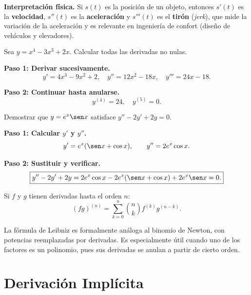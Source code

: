 \textbf{Interpretación física.} Si $s(t)$ es la posición de un objeto, entonces $s'(t)$ es la \textbf{velocidad}, $s''(t)$ es la \textbf{aceleración} y $s'''(t)$ es el \textbf{tirón} (\emph{jerk}), que mide la variación de la aceleración y es relevante en ingeniería de confort (diseño de vehículos y elevadores).

\begin{example}
Sea $y = x^4 - 3x^3 + 2x$. Calcular todas las derivadas no nulas.

\begin{myproof}

\textbf{Paso 1: Derivar sucesivamente.}
\[
y' = 4x^3-9x^2+2, \quad y'' = 12x^2-18x, \quad y''' = 24x-18.
\]

\textbf{Paso 2: Continuar hasta anularse.}
\[
\boxed{y^{(4)} = 24, \quad y^{(5)} = 0.}
\]
\end{myproof}
\end{example}

\begin{example}
Demostrar que $y = e^x\sen x$ satisface $y''-2y'+2y=0$.

\begin{myproof}

\textbf{Paso 1: Calcular $y'$ y $y''$.}
\[
y' = e^x(\sen x+\cos x), \qquad y'' = 2e^x\cos x.
\]

\textbf{Paso 2: Sustituir y verificar.}
\[
\boxed{y''-2y'+2y = 2e^x\cos x - 2e^x(\sen x+\cos x) + 2e^x\sen x = 0.}
\]
\end{myproof}
\end{example}

\begin{theorem}
Si $f$ y $g$ tienen derivadas hasta el orden $n$:
\[
(fg)^{(n)} = \sum_{k=0}^{n}\binom{n}{k}f^{(k)}g^{(n-k)}.
\]
\end{theorem}

\begin{rem}
La fórmula de Leibniz es formalmente análoga al binomio de Newton, con potencias reemplazadas por derivadas. Es especialmente útil cuando uno de los factores es un polinomio, pues sus derivadas se anulan a partir de
cierto orden.
\end{rem}

\section{Derivación Implícita}

